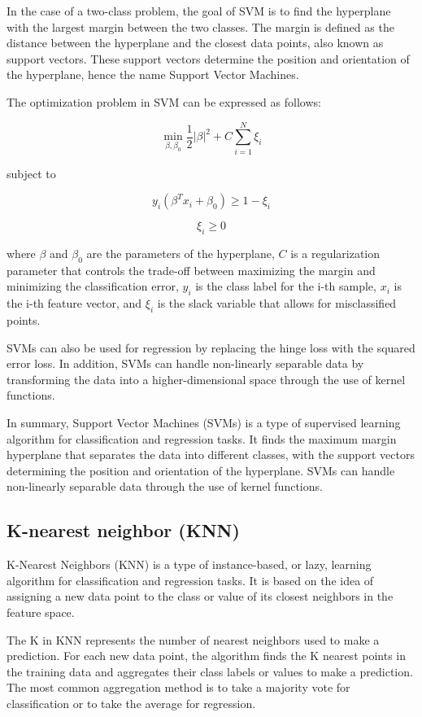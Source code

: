 \documentclass[12pt, a4paper, oneside]{article}
\begin{document}
In the case of a two-class problem, the goal of SVM is to find the hyperplane with the largest margin between the two classes. The margin is defined as the distance between the hyperplane and the closest data points, also known as support vectors. These support vectors determine the position and orientation of the hyperplane, hence the name Support Vector Machines.

The optimization problem in SVM can be expressed as follows:

$$\min_{\beta, \beta_0} \frac{1}{2} \left| \beta \right|^2 + C \sum_{i=1}^{N} \xi_i$$

subject to

$$y_i (\beta^T x_i + \beta_0) \geq 1 - \xi_i$$

$$\xi_i \geq 0$$

where $\beta$ and $\beta_0$ are the parameters of the hyperplane, $C$ is a regularization parameter that controls the trade-off between maximizing the margin and minimizing the classification error, $y_i$ is the class label for the i-th sample, $x_i$ is the i-th feature vector, and $\xi_i$ is the slack variable that allows for misclassified points.

SVMs can also be used for regression by replacing the hinge loss with the squared error loss. In addition, SVMs can handle non-linearly separable data by transforming the data into a higher-dimensional space through the use of kernel functions.

In summary, Support Vector Machines (SVMs) is a type of supervised learning algorithm for classification and regression tasks. It finds the maximum margin hyperplane that separates the data into different classes, with the support vectors determining the position and orientation of the hyperplane. SVMs can handle non-linearly separable data through the use of kernel functions.


\subsection{ K-nearest neighbor (KNN) }
K-Nearest Neighbors (KNN) is a type of instance-based, or lazy, learning algorithm for classification and regression tasks. It is based on the idea of assigning a new data point to the class or value of its closest neighbors in the feature space.

The K in KNN represents the number of nearest neighbors used to make a prediction. For each new data point, the algorithm finds the K nearest points in the training data and aggregates their class labels or values to make a prediction. The most common aggregation method is to take a majority vote for classification or to take the average for regression.
\end{document}
